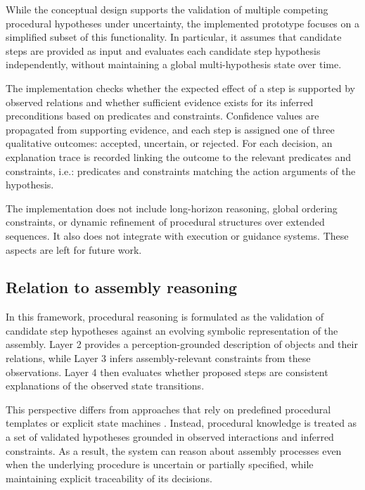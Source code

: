 \documentclass[11pt,titlepage,openright]{book}
\begin{document}
While the conceptual design supports the validation of multiple competing procedural hypotheses under uncertainty, the implemented prototype focuses on a simplified subset of this functionality. In particular, it assumes that candidate steps are provided as input and evaluates each candidate step hypothesis independently, without maintaining a global multi-hypothesis state over time.

The implementation checks whether the expected effect of a step is supported by observed relations and whether sufficient evidence exists for its inferred preconditions based on predicates and constraints. Confidence values are propagated from supporting evidence, and each step is assigned one of three qualitative outcomes: accepted, uncertain, or rejected. For each decision, an explanation trace is recorded linking the outcome to the relevant predicates and constraints, i.e.: predicates and constraints matching the action arguments of the hypothesis.

The implementation does not include long-horizon reasoning, global ordering constraints, or dynamic refinement of procedural structures over extended sequences. It also does not integrate with execution or guidance systems. These aspects are left for future work.

\subsection{Relation to assembly reasoning}

In this framework, procedural reasoning is formulated as the validation of candidate step hypotheses against an evolving symbolic representation of the assembly. Layer 2 provides a perception-grounded description of objects and their relations, while Layer 3 infers assembly-relevant constraints from these observations. Layer 4 then evaluates whether proposed steps are consistent explanations of the observed state transitions.

This perspective differs from approaches that rely on predefined procedural templates or explicit state machines \citep{Stanescu_2022,Stanescu_2023,Stanescu_2024}. Instead, procedural knowledge is treated as a set of validated hypotheses grounded in observed interactions and inferred constraints. As a result, the system can reason about assembly processes even when the underlying procedure is uncertain or partially specified, while maintaining explicit traceability of its decisions.
\end{document}
